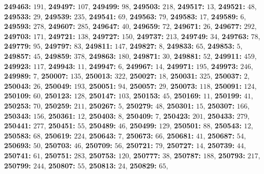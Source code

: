 \textsf{\bfseries 249463:} $191$, \textsf{\bfseries 249497:} $107$, \textsf{\bfseries 249499:} $98$, \textsf{\bfseries 249503:} $218$, \textsf{\bfseries 249517:} $13$, \textsf{\bfseries 249521:} $48$, \textsf{\bfseries 249533:} $29$, \textsf{\bfseries 249539:} $235$, \textsf{\bfseries 249541:} $69$, \textsf{\bfseries 249563:} $79$, \textsf{\bfseries 249583:} $17$, \textsf{\bfseries 249589:} $6$, \textsf{\bfseries 249593:} $278$, \textsf{\bfseries 249607:} $285$, \textsf{\bfseries 249647:} $40$, \textsf{\bfseries 249659:} $72$, \textsf{\bfseries 249671:} $26$, \textsf{\bfseries 249677:} $292$, \textsf{\bfseries 249703:} $171$, \textsf{\bfseries 249721:} $138$, \textsf{\bfseries 249727:} $150$, \textsf{\bfseries 249737:} $213$, \textsf{\bfseries 249749:} $34$, \textsf{\bfseries 249763:} $78$, \textsf{\bfseries 249779:} $95$, \textsf{\bfseries 249797:} $83$, \textsf{\bfseries 249811:} $147$, \textsf{\bfseries 249827:} $8$, \textsf{\bfseries 249833:} $65$, \textsf{\bfseries 249853:} $5$, \textsf{\bfseries 249857:} $45$, \textsf{\bfseries 249859:} $378$, \textsf{\bfseries 249863:} $180$, \textsf{\bfseries 249871:} $30$, \textsf{\bfseries 249881:} $52$, \textsf{\bfseries 249911:} $459$, \textsf{\bfseries 249923:} $117$, \textsf{\bfseries 249943:} $11$, \textsf{\bfseries 249947:} $6$, \textsf{\bfseries 249967:} $14$, \textsf{\bfseries 249971:} $195$, \textsf{\bfseries 249973:} $246$, \textsf{\bfseries 249989:} $7$, \textsf{\bfseries 250007:} $135$, \textsf{\bfseries 250013:} $322$, \textsf{\bfseries 250027:} $18$, \textsf{\bfseries 250031:} $325$, \textsf{\bfseries 250037:} $2$, \textsf{\bfseries 250043:} $26$, \textsf{\bfseries 250049:} $193$, \textsf{\bfseries 250051:} $94$, \textsf{\bfseries 250057:} $29$, \textsf{\bfseries 250073:} $118$, \textsf{\bfseries 250091:} $124$, \textsf{\bfseries 250109:} $60$, \textsf{\bfseries 250123:} $128$, \textsf{\bfseries 250147:} $103$, \textsf{\bfseries 250153:} $45$, \textsf{\bfseries 250169:} $11$, \textsf{\bfseries 250199:} $41$, \textsf{\bfseries 250253:} $70$, \textsf{\bfseries 250259:} $211$, \textsf{\bfseries 250267:} $5$, \textsf{\bfseries 250279:} $48$, \textsf{\bfseries 250301:} $15$, \textsf{\bfseries 250307:} $166$, \textsf{\bfseries 250343:} $156$, \textsf{\bfseries 250361:} $12$, \textsf{\bfseries 250403:} $8$, \textsf{\bfseries 250409:} $7$, \textsf{\bfseries 250423:} $201$, \textsf{\bfseries 250433:} $279$, \textsf{\bfseries 250441:} $277$, \textsf{\bfseries 250451:} $55$, \textsf{\bfseries 250489:} $46$, \textsf{\bfseries 250499:} $129$, \textsf{\bfseries 250501:} $88$, \textsf{\bfseries 250543:} $12$, \textsf{\bfseries 250583:} $68$, \textsf{\bfseries 250619:} $224$, \textsf{\bfseries 250643:} $7$, \textsf{\bfseries 250673:} $66$, \textsf{\bfseries 250681:} $41$, \textsf{\bfseries 250687:} $54$, \textsf{\bfseries 250693:} $50$, \textsf{\bfseries 250703:} $46$, \textsf{\bfseries 250709:} $56$, \textsf{\bfseries 250721:} $79$, \textsf{\bfseries 250727:} $14$, \textsf{\bfseries 250739:} $44$, \textsf{\bfseries 250741:} $61$, \textsf{\bfseries 250751:} $283$, \textsf{\bfseries 250753:} $120$, \textsf{\bfseries 250777:} $38$, \textsf{\bfseries 250787:} $188$, \textsf{\bfseries 250793:} $217$, \textsf{\bfseries 250799:} $244$, \textsf{\bfseries 250807:} $55$, \textsf{\bfseries 250813:} $24$, \textsf{\bfseries 250829:} $65$, 
